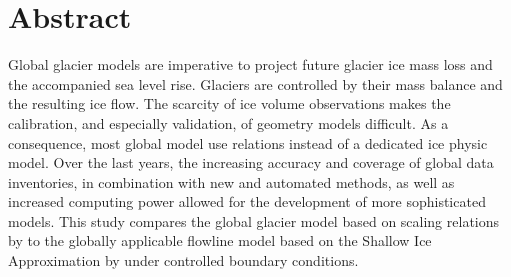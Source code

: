 \chapter*{Abstract}
\thispagestyle{plain}




Global glacier models are imperative to project future glacier ice mass loss and the accompanied sea level rise. Glaciers are controlled by their mass balance and the resulting ice flow.
The scarcity of ice volume observations makes the calibration, and especially validation, of geometry models difficult. As a consequence, most global model use \vas{} relations instead of a dedicated ice physic model. Over the last years, the increasing accuracy and coverage of global data inventories, in combination with new and automated methods, as well as increased computing power allowed for the development of more sophisticated models. This study compares the global glacier model based on scaling relations by \citet{Marzeion2012b} to the globally applicable flowline model based on the Shallow Ice Approximation by \citet{Maussion2019} under controlled boundary conditions.

